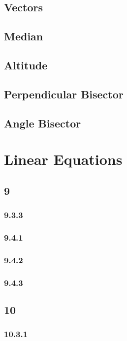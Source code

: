 \documentclass[11pt]{book}
\begin{document}
\section{Vectors}

\section{Median}

\section{Altitude}

\section{Perpendicular Bisector}

\section{Angle Bisector}

%
\chapter{Linear Equations}
\section{9}
\subsection{9.3.3}

\subsection{9.4.1}

\subsection{9.4.2}

\subsection{9.4.3}

\section{10}
\subsection{10.3.1}

\end{document}
